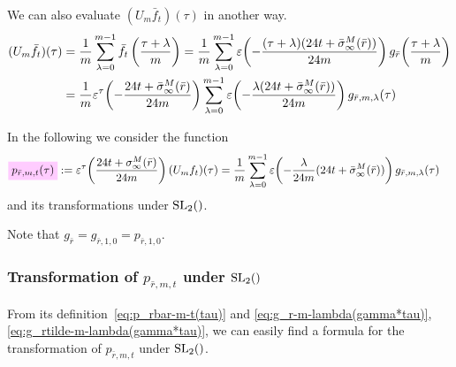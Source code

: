 \documentclass{article}
\begin{document}
We can also evaluate $(U_m\bar{f}_t)(\tau)$ in another way.
%
\begin{align*}
  (U_m\bar{f}_t)(\tau)
  &=
  \frac{1}{m} \sum_{\lambda=0}^{m-1}\bar{f}_t\left(\frac{\tau+\lambda}{m}\right)
    =
    \frac{1}{m} \sum_{\lambda=0}^{m-1}
    \unityPower{-\frac{(\tau+\lambda) (24 t + \sigmainftybar[M]{\bar{r}})}{24 m}}
    g_{\bar{r}}\!\left(\frac{\tau+\lambda}{m}\right)
  \\
  &=
  \frac{1}{m}
  \unityPowerTau{-\frac{24t+\sigmainftybar[M]{\bar{r}}}{24m}}
  \sum_{\lambda=0}^{m-1}
  \unityPower{-\frac{\lambda (24t+\sigmainftybar[M]{\bar{r}})}{24m}}
  g_{\bar{r},m,\lambda}(\tau)
\end{align*}


In the following we consider the function
\begin{align}
  \defineNotation[p-rbar-m-t-tau]{p_{\bar{r},m,t}(\tau)}
  &:= \unityPowerTau{\frac{24t+\sigmainfty[M]{\bar{r}}}{24m} } (U_mf_t)(\tau)
  =
    \frac{1}{m} \sum_{\lambda=0}^{m-1}
    \unityPower{-\frac{\lambda}{24m} (24t+\sigmainftybar[M]{\bar{r}})}
    g_{\bar{r},m,\lambda}(\tau)
  \label{eq:p_rbar-m-t(tau)}
\end{align}
and its transformations under $\SL2Z$.

Note that $g_{\bar{r}} = g_{\bar{r},1,0}=p_{\bar{r},1,0}$.


\subsubsection{Transformation of $p_{\bar{r},m,t}$ under $\SL2Z$}

From its definition~\eqref{eq:p_rbar-m-t(tau)} and
\eqref{eq:g_r-m-lambda(gamma*tau)},
\eqref{eq:g_rtilde-m-lambda(gamma*tau)}, we can easily find a formula
for the transformation of $p_{\bar{r},m,t}$ under $\SL2Z$.
\end{document}
